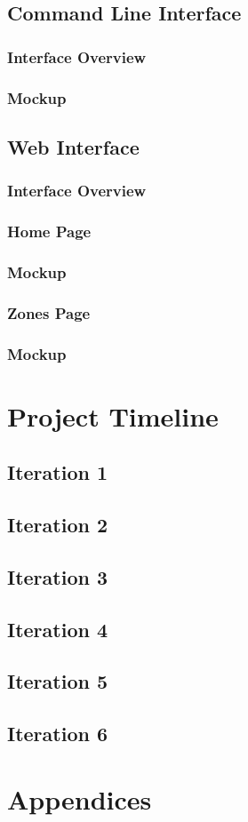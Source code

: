 \documentclass[onecolumn, draftclsnofoot,10pt, compsoc]{IEEEtran}
\begin{document}
		\subsection{Command Line Interface}
			\subsubsection{Interface Overview}
			\subsubsection{Mockup}
		\subsection{Web Interface}
			\subsubsection{Interface Overview}
			\subsubsection{Home Page}
			\subsubsection{Mockup}
			\subsubsection{Zones Page}
			\subsubsection{Mockup}

	\section{Project Timeline}
		\subsection{Iteration 1}
		\subsection{Iteration 2}
		\subsection{Iteration 3}
		\subsection{Iteration 4}
		\subsection{Iteration 5}
		\subsection{Iteration 6}


	\section{Appendices} %
\end{document}
